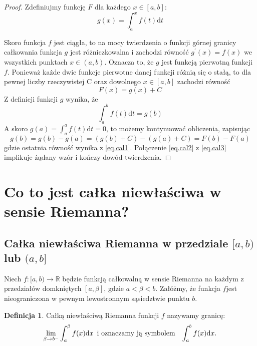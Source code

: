 \documentclass{article}
\numberwithin{equation}{section}
\theoremstyle{definition}
\newtheorem{definition}{Definicja}[section]
\theoremstyle{case}
\newcommand*{\R}{\mathbb{R}}
\begin{document}
\begin{proof}
	Zdefiniujmy funkcję $F$ dla każdego ${x \in [a,b]}$:
	\begin{equation*}
		g(x) = \textstyle \int_a^x f(t) \mathrm{d}t
	\end{equation*}

	Skoro funkcja $f$ jest ciągła, to na mocy twierdzenia o funkcji
	górnej granicy całkowania funkcja $g$ jest różniczkowalna
	i zachodzi równość ${g^\prime(x)=f(x)}$ we wszystkich punktach ${x \in (a,b)}$.
	Oznacza to, że $g$ jest funkcją pierwotną funkcji $f$.
	Ponieważ każde dwie funkcje pierwotne danej funkcji różnią się o stałą,
	to dla pewnej liczby rzeczywistej C oraz dowolnego ${x \in [a,b]}$
	zachodzi równość
	\begin{equation}
		\label{eq.cal1}
		F(x)=g(x)+C
	\end{equation}
	Z definicji funkcji $g$ wynika, że
	\begin{equation}
		\label{eq.cal2}
		\textstyle \int_a^b f(t) \mathrm{d}t = g(b)
	\end{equation}
	A skoro $g(a) = \textstyle \int_a^a f(t) \mathrm{d}t=0$,
	to możemy kontynuować obliczenia, zapisując
	\begin{equation}
		\label{eq.cal3}
		g(b)=g(b)-g(a)=(g(b)+C)-(g(a)+C)=F(b)-F(a)
	\end{equation}
	gdzie ostatnia równość wynika z \eqref{eq.cal1}. Połączenie \eqref{eq.cal2} z \eqref{eq.cal3} implikuje żądany wzór i kończy dowód twierdzenia.
\end{proof}

\section{Co to jest całka niewłaściwa w sensie Riemanna?}
\subsection{Całka niewłaściwa Riemanna w przedziale $[a,b)$ lub $(a,b]$}
Niech ${f \colon [a,b) \to \R}$ będzie funkcją całkowalną w sensie Riemanna
	na każdym z przedziałów domkniętych ${[a,\beta]}$,
	gdzie $a < \beta < b$.
	Załóżmy, że funkcja $f$jest nieograniczona w pewnym lewostronnym sąsiedztwie punktu $b$.
	\begin{definition}
		\label{def.1}
		Całką niewłaściwą Riemanna funkcji $f$ nazywamy granicę:
		\begin{equation*}
			\lim_{\beta \to b^-} \int _a ^{\beta} f(x) \mathrm{d}x
			\textnormal{\enskip i oznaczamy ją symbolem \enskip}
			\int_a^b f(x) \mathrm{d}x
			\textnormal{.}
		\end{equation*}
	\end{definition}
\end{document}
